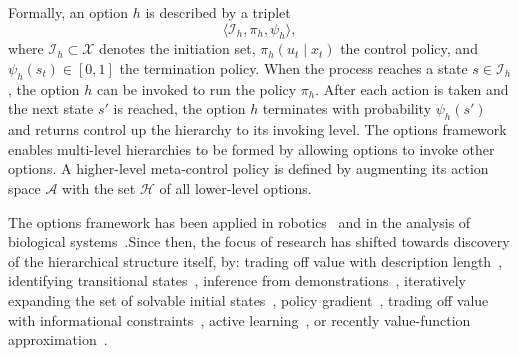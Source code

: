  Formally, an option $h$ is described by a triplet \[\langle \mathcal{I}_h, \pi_h, \psi_h \rangle,\] where $\mathcal{I}_h \subset \mathcal{X}$ denotes the initiation set, $\pi_h(u_t \mid x_t)$ the control policy, and $\psi_h(s_t) \in [0,1]$ the termination policy. When the process reaches a state $s \in \mathcal{I}_h$, the option $h$ can be invoked to run the policy $\pi_h$. After each action is taken and the next state $s'$ is reached, the option $h$ terminates with probability $\psi_h(s')$ and returns control up the hierarchy to its invoking level. The options framework enables multi-level hierarchies to be formed by allowing options to invoke other options. A higher-level meta-control policy is defined by augmenting its action space $\mathcal{A}$ with the set $\mathcal{H}$ of all lower-level options. 

The options framework has been applied in robotics~\cite{konidarisKGB12, krishnan2016swirl, sermanet2016unsupervised} and in the analysis of biological systems~\cite{botvinick08,botvinick2009hierarchically,solway2014optimal,zacksKEH11,whitenFBL06}.Since then, the focus of research has shifted towards discovery of the hierarchical structure itself, by: trading off value with description length~\cite{thrunS94}, identifying transitional states~\cite{mcgovernB01,menacheMS02,simsekB04,stolle04,lakshminarayananKKR16}, inference from demonstrations~\cite{buiVW02,krishnan2015transition,daniel2012hierarchical,krishnan2016swirl}, iteratively expanding the set of solvable initial states~\cite{konidarisB09,konidarisKGB12}, policy gradient~\cite{LevyS11}, trading off value with informational constraints~\cite{geneweinLGB15,foxMT16,jonssonG16,florensaDA17}, active learning~\cite{hamidiTGF15}, or recently value-function approximation~\cite{baconHP16,heess2016learning,sharmaLR17}.


